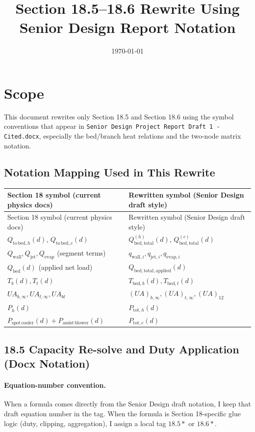 \documentclass[11pt]{article}
\title{Section 18.5--18.6 Rewrite Using Senior Design Report Notation}
\author{}
\date{\today}
\begin{document}
\maketitle

\section*{Scope}
This document rewrites only Section 18.5 and Section 18.6 using the symbol conventions that appear in \texttt{Senior Design Project Report Draft 1 - Cited.docx}, especially the bed/branch heat relations and the two-node matrix notation.

\subsection*{Notation Mapping Used in This Rewrite}
\begin{longtable}{@{}p{}p{}@{}}
\toprule
Section 18 symbol (current physics docs) & Rewritten symbol (Senior Design draft style) \\
\midrule
\endfirsthead
\toprule
Section 18 symbol (current physics docs) & Rewritten symbol (Senior Design draft style) \\
\midrule
\endhead
\(Q_{\mathrm{to\,bed},h}(d)\), \(Q_{\mathrm{to\,bed},c}(d)\) & \(Q_{\mathrm{bed,total}}^{(h)}(d)\), \(Q_{\mathrm{bed,total}}^{(c)}(d)\) \\
\(Q_{\mathrm{wall}},Q_{\mathrm{jet}},Q_{\mathrm{evap}}\) (segment terms) & \(q_{\mathrm{wall},i},q_{\mathrm{jet},i},q_{\mathrm{evap},i}\) \\
\(Q_{\mathrm{bed}}(d)\) (applied net load) & \(Q_{\mathrm{bed,total,applied}}(d)\) \\
\(T_b(d),T_t(d)\) & \(T_{\mathrm{bed},b}(d),T_{\mathrm{bed},t}(d)\) \\
\(UA_{b,\infty},UA_{t,\infty},UA_{bt}\) & \((UA)_{b,\infty},(UA)_{t,\infty},(UA)_{12}\) \\
\(P_h(d)\) & \(P_{\mathrm{tot},h}(d)\) \\
\(P_{\mathrm{spot\,cooler}}(d)+P_{\mathrm{assist\,blower}}(d)\) & \(P_{\mathrm{tot},c}(d)\) \\
\bottomrule
\end{longtable}

\subsection*{18.5 Capacity Re-solve and Duty Application (Docx Notation)}
\paragraph{Equation-number convention.}
When a formula comes directly from the Senior Design draft notation, I keep that draft equation number in the tag. When the formula is Section 18-specific glue logic (duty, clipping, aggregation), I assign a local tag \(18.5\ast\) or \(18.6\ast\).
\end{document}

